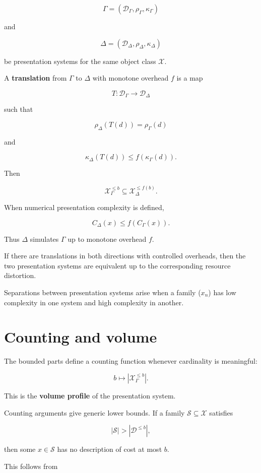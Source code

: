 \documentclass[11pt]{article}
\begin{document}
\[
\Gamma=(\mathcal D_\Gamma,\rho_\Gamma,\kappa_\Gamma)
\]

and

\[
\Delta=(\mathcal D_\Delta,\rho_\Delta,\kappa_\Delta)
\]

be presentation systems for the same object class \(\mathcal X\).

A \textbf{translation} from \(\Gamma\) to \(\Delta\) with monotone overhead \(f\) is a map

\[
T:\mathcal D_\Gamma\to\mathcal D_\Delta
\]

such that

\[
\rho_\Delta(T(d))=\rho_\Gamma(d)
\]

and

\[
\kappa_\Delta(T(d))\leq f(\kappa_\Gamma(d)).
\]

Then

\[
\mathcal X_\Gamma^{\leq b}
\subseteq
\mathcal X_\Delta^{\leq f(b)}.
\]

When numerical presentation complexity is defined,

\[
C_\Delta(x)
\leq
f(C_\Gamma(x)).
\]

Thus \(\Delta\) simulates \(\Gamma\) up to monotone overhead \(f\).

If there are translations in both directions with controlled overheads, then the two presentation systems are equivalent up to the corresponding resource distortion.

Separations between presentation systems arise when a family (\(x_n\)) has low complexity in one system and high complexity in another.


\section{Counting and volume}

The bounded parts define a counting function whenever cardinality is meaningful:

\[
b\mapsto |\mathcal X_\Gamma^{\leq b}|.
\]

This is the \textbf{volume profile} of the presentation system.

Counting arguments give generic lower bounds. If a family \(\mathcal S\subseteq\mathcal X\) satisfies

\[
|\mathcal S|>|\mathcal D^{\leq b}|,
\]

then some \(x\in\mathcal S\) has no description of cost at most \(b\).

This follows from
\end{document}

